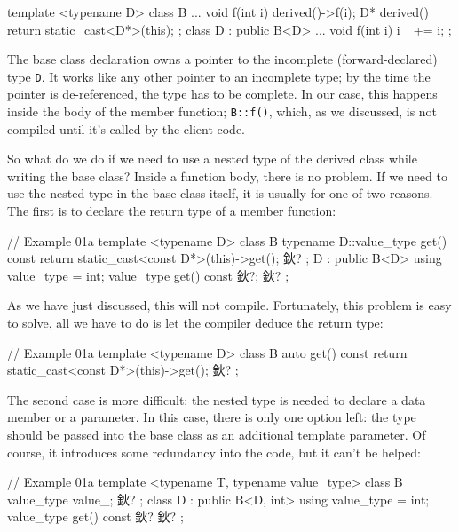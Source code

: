 \begin{code}
template <typename D> class B {
  ...
  void f(int i) { derived()->f(i); }
  D* derived() { return static_cast<D*>(this); }
};
class D : public B<D> {
  ...
  void f(int i) { i_ += i; }
};
\end{code}

The base class declaration owns a pointer to the incomplete (forward-declared) type \texttt{D}. It works like any other pointer to an incomplete type; by the time the pointer is de-referenced, the type has to be complete. In our case, this happens inside the body of the member function; \texttt{B::f()}, which, as we discussed, is not compiled until it's called by the client code.

So what do we do if we need to use a nested type of the derived class while writing the base class? Inside a function body, there is no problem. If we need to use the nested type in the base class itself, it is usually for one of two reasons. The first is to declare the return type of a member function:

\begin{code}
// Example 01a
template <typename D> class B {
  typename D::value_type get() const {
    return static_cast<const D*>(this)->get();
  }
  鈥?
};
D : public B<D> {
  using value_type = int;
  value_type get() const { 鈥?};
  鈥?
};
\end{code}

As we have just discussed, this will not compile. Fortunately, this problem is easy to solve, all we have to do is let the compiler deduce the return type:

\begin{code}
// Example 01a
template <typename D> class B {
  auto get() const {
    return static_cast<const D*>(this)->get();
  }
  鈥?
};
\end{code}

The second case is more difficult: the nested type is needed to declare a data member or a parameter. In this case, there is only one option left: the type should be passed into the base class as an additional template parameter. Of course, it introduces some redundancy into the code, but it can't be helped:

\begin{code}
// Example 01a
template <typename T, typename value_type> class B {
  value_type value_;
  鈥?
};
class D : public B<D, int> {
  using value_type = int;
  value_type get() const { 鈥?}
  鈥?
};
\end{code}

